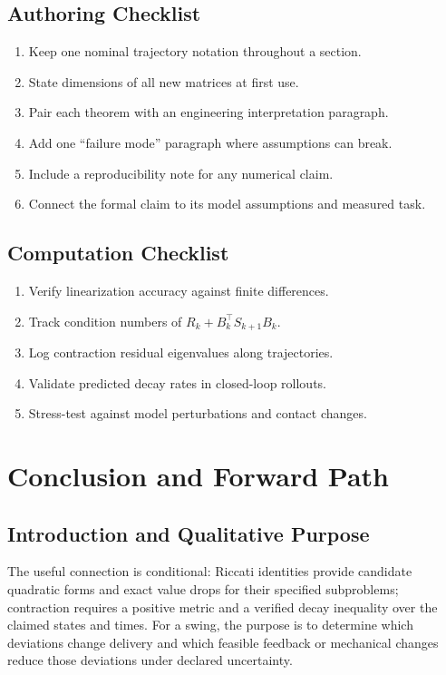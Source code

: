 \documentclass[11pt,letterpaper]{article}
\begin{document}
\subsection{Authoring Checklist}
\begin{enumerate}[label=\arabic*.]
\item Keep one nominal trajectory notation throughout a section.
\item State dimensions of all new matrices at first use.
\item Pair each theorem with an engineering interpretation paragraph.
\item Add one ``failure mode'' paragraph where assumptions can break.
\item Include a reproducibility note for any numerical claim.
\item Connect the formal claim to its model assumptions and measured task.
\end{enumerate}

\subsection{Computation Checklist}
\begin{enumerate}[label=\arabic*.]
\item Verify linearization accuracy against finite differences.
\item Track condition numbers of $R_k + B_k^\top S_{k+1}B_k$.
\item Log contraction residual eigenvalues along trajectories.
\item Validate predicted decay rates in closed-loop rollouts.
\item Stress-test against model perturbations and contact changes.
\end{enumerate}

\section{Conclusion and Forward Path}

\subsection{Introduction and Qualitative Purpose}
The useful connection is conditional: Riccati identities provide candidate quadratic forms and exact value drops for their specified subproblems; contraction requires a positive metric and a verified decay inequality over the claimed states and times. For a swing, the purpose is to determine which deviations change delivery and which feasible feedback or mechanical changes reduce those deviations under declared uncertainty.
\end{document}
